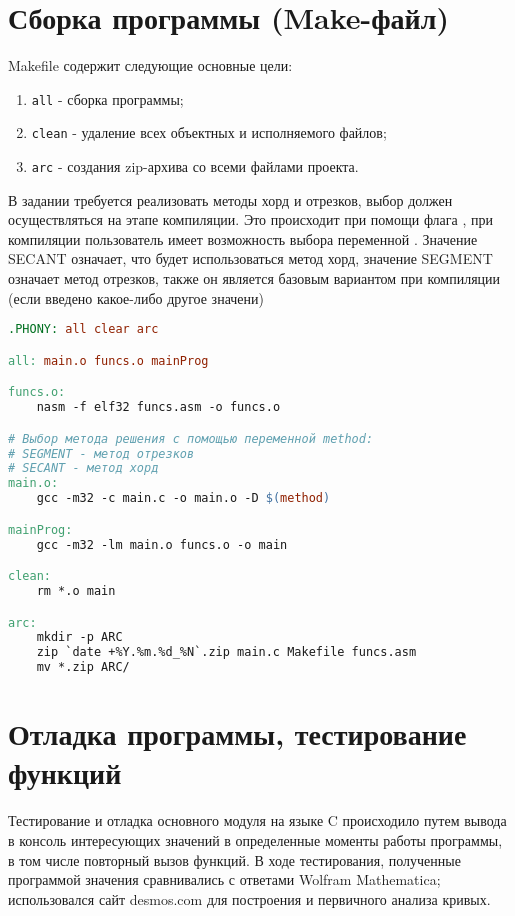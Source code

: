 \documentclass[a4paper,12pt,titlepage,finall]{article}
\begin{document}
\newpage

\section{Сборка программы (Make-файл)}

Makefile содержит следующие основные цели:
\begin{enumerate}
\item \texttt{all} - сборка программы;
\item \texttt{clean} - удаление всех объектных и исполняемого файлов;
\item \texttt{arc} - создания zip-архива со всеми файлами проекта.
\end{enumerate}

В задании требуется реализовать методы хорд и отрезков, выбор должен осуществляться на этапе компиляции. Это происходит при помощи флага , при компиляции пользователь имеет возможность выбора переменной . Значение SECANT означает, что будет использоваться метод хорд, значение SEGMENT означает метод отрезков, также он является базовым вариантом при компиляции (если введено какое-либо другое значени) \\

\begin{lstlisting}[language=make, caption={Текст Makefile}, captionpos=b]
.PHONY: all clear arc

all: main.o funcs.o mainProg

funcs.o:
	nasm -f elf32 funcs.asm -o funcs.o

# Выбор метода решения с помощью переменной method:
# SEGMENT - метод отрезков
# SECANT - метод хорд
main.o:
	gcc -m32 -c main.c -o main.o -D $(method)

mainProg:
	gcc -m32 -lm main.o funcs.o -o main

clean:
	rm *.o main

arc:
	mkdir -p ARC
	zip `date +%Y.%m.%d_%N`.zip main.c Makefile funcs.asm
	mv *.zip ARC/
\end{lstlisting}

\newpage

\section{Отладка программы, тестирование функций}

Тестирование и отладка основного модуля на языке C происходило путем вывода в консоль интересующих значений в определенные моменты работы программы, в том числе повторный вызов функций. В ходе тестирования, полученные программой значения сравнивались с ответами Wolfram Mathematica; использовался сайт desmos.com для построения и первичного анализа кривых.\\
\end{document}
